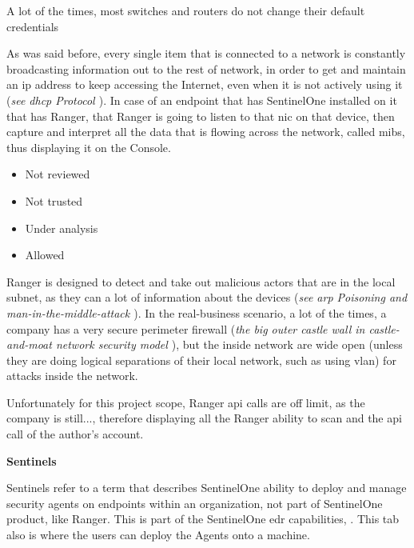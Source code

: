 \begin{multicols}{2}
      A lot of the times, most switches and routers do not change their default credentials

      As was said before, every single item that is connected to a network is constantly broadcasting information out to the rest of
      network, in order to get and maintain an \acrshort{ip} address to keep accessing the Internet, even when it is not actively using
      it (\textit{see \acrshort{dhcp} Protocol \cite{dhcpProcess}}). In case of an endpoint that has SentinelOne installed on it that
      has Ranger, that Ranger is going to listen to that \acrshort{nic} on that device, then capture and interpret all the data that
      is flowing across the network, called \acrshort{mib}s, thus displaying it on the Console.

      \begin{itemize}
            \item Not reviewed
            \item Not trusted
            \item Under analysis
            \item Allowed
      \end{itemize}

      Ranger is designed to detect and take out malicious actors that are in the local subnet, as they can a lot of information about the
      devices (\textit{see \acrshort{arp} Poisoning \cite{arpSpoofing} and man-in-the-middle-attack \cite{man-in-the-middleAttack}}).
      In the real-business scenario, a lot of the times, a company has a very secure perimeter firewall
      (\textit{the big outer castle wall in castle-and-moat network security model \cite{castleMoatWallNetwork}}), but the inside network
      are wide open (unless they are doing logical separations of their local network, such as using \acrshort{vlan}) for attacks inside
      the network.

      Unfortunately for this project scope, Ranger \acrshort{api} calls are off limit, as the company is still..., therefore displaying all
      the Ranger ability to scan and the \acrshort{api} call of the author's account.

      \textbf{Sentinels}

      Sentinels refer to a term that describes SentinelOne ability to deploy and manage security agents on endpoints within an
      organization, not part of SentinelOne product, like Ranger. This is part of the SentinelOne \acrshort{edr} capabilities, .
      This tab also is where the users can deploy the Agents onto a machine.


\end{multicols}
